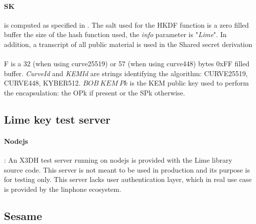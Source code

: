 \documentclass[a4paper,11pt]{article}
\makeatletter
\newcommand{\StatexIndent}[1][3]{%
  \setlength\@tempdima{\algorithmicindent}%
  \Statex\hskip\dimexpr#1\@tempdima\relax}
\makeatother
\begin{document}
      \paragraph{SK}is computed as specified in \cite{pqxdh}. The salt used for the HKDF function is a zero filled buffer the size of the hash function used, the \textit{info} parameter is "\textit{Lime}". In addition, a transcript of all public material is used in the Shared secret derivation
        \paragraph*{}F is a 32 (when using curve25519) or 57 (when using curve448) bytes 0xFF filled buffer. \textit{CurveId} and \textit{KEMId} are strings identifying the algorithm: CURVE25519, CURVE448, KYBER512. $BOB\ KEM\ Pk$ is the KEM public key used to perform the encapsulation: the OPk if present or the SPk otherwise.

  \subsection{Lime key test server}
    \paragraph*{Nodejs}: An X3DH test server running on nodejs is provided with the Lime library source code. This server is not meant to be used in production and its purpose is for testing only. This server lacks user authentication layer, which in real use case is provided by the linphone ecosystem.

  \subsection{Sesame}
\end{document}
